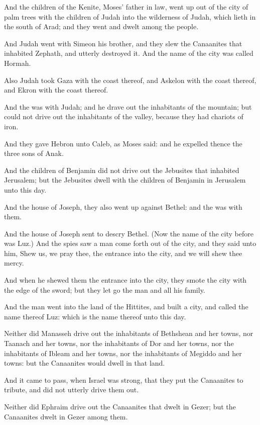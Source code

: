 \Verse And the children of the Kenite, Moses' father in law, went up out of the city of palm trees with the children of Judah into the wilderness of Judah, which lieth in the south of Arad; and they went and dwelt among the people.

\Verse And Judah went with Simeon his brother, and they slew the Canaanites that inhabited Zephath, and utterly destroyed it. And the name of the city was called Hormah.

\Verse Also Judah took Gaza with the coast thereof, and Askelon with the coast thereof, and Ekron with the coast thereof.

\Verse And the \LORD was with Judah; and he drave out the inhabitants of the mountain; but could not drive out the inhabitants of the valley, because they had chariots of iron.

\Verse And they gave Hebron unto Caleb, as Moses said: and he expelled thence the three sons of Anak.

\Verse And the children of Benjamin did not drive out the Jebusites that inhabited Jerusalem; but the Jebusites dwell with the children of Benjamin in Jerusalem unto this day.

\Verse And the house of Joseph, they also went up against Bethel: and the \LORD was with them.

\Verse And the house of Joseph sent to descry Bethel. (Now the name of the city before was Luz.)  \Verse And the spies saw a man come forth out of the city, and they said unto him, Shew us, we pray thee, the entrance into the city, and we will shew thee mercy.

\Verse And when he shewed them the entrance into the city, they smote the city with the edge of the sword; but they let go the man and all his family.

\Verse And the man went into the land of the Hittites, and built a city, and called the name thereof Luz: which is the name thereof unto this day.

\Verse Neither did Manasseh drive out the inhabitants of Bethshean and her towns, nor Taanach and her towns, nor the inhabitants of Dor and her towns, nor the inhabitants of Ibleam and her towns, nor the inhabitants of Megiddo and her towns: but the Canaanites would dwell in that land.

\Verse And it came to pass, when Israel was strong, that they put the Canaanites to tribute, and did not utterly drive them out.

\Verse Neither did Ephraim drive out the Canaanites that dwelt in Gezer; but the Canaanites dwelt in Gezer among them.


